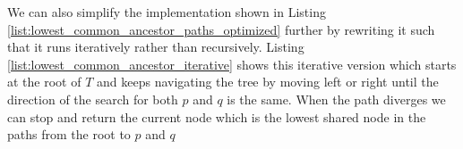 	



We can also simplify the implementation shown in Listing
\ref{list:lowest_common_ancestor_paths_optimized} further by rewriting it such that it runs iteratively
rather than recursively. Listing \ref{list:lowest_common_ancestor_iterative} shows this iterative version which starts at the root of $T$
and keeps navigating the tree by moving left or right until the direction of the search for
both $p$ and $q$ is the same. When the path diverges we can stop and return the current node which
is the lowest shared node in the paths from the root to $p$ and $q$


	
